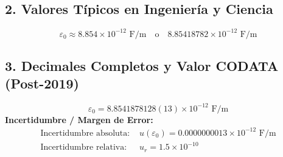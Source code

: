 \documentclass[12pt,a4paper]{article}
\begin{document}
\subsection*{2. Valores Típicos en Ingeniería y Ciencia}
\begin{equation*}
\varepsilon_0 \approx 8.854 \times 10^{-12} \text{ F/m} \quad \text{o} \quad 8.85418782 \times 10^{-12} \text{ F/m}
\end{equation*}

\subsection*{3. Decimales Completos y Valor CODATA (Post-2019)}
\begin{equation*}
\varepsilon_0 = 8.8541878128(13) \times 10^{-12} \text{ F/m}
\end{equation*}
\textbf{Incertidumbre / Margen de Error:}
\begin{align*}
\text{Incertidumbre absoluta: } & u(\varepsilon_0) = 0.0000000013 \times 10^{-12} \text{ F/m} \\
\text{Incertidumbre relativa: } & u_r = 1.5 \times 10^{-10}
\end{align*}
\end{document}
